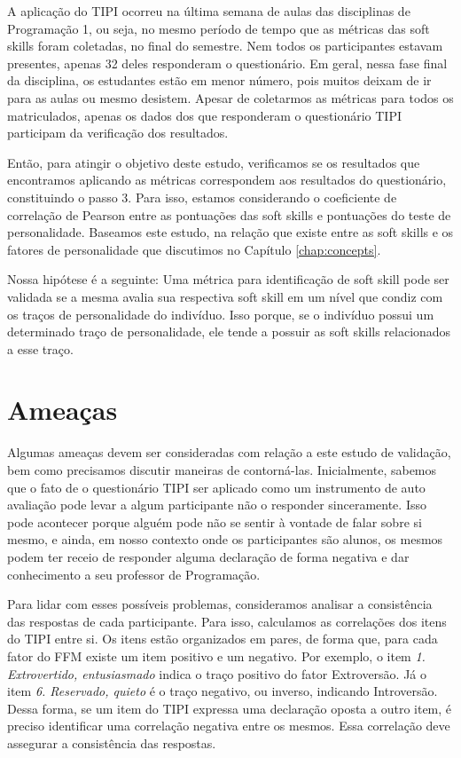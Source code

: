 A aplicação do TIPI ocorreu na última semana de aulas das disciplinas de Programação 1, ou seja, no mesmo período de tempo que as métricas das soft skills foram coletadas, no final do semestre. Nem todos os participantes estavam presentes, apenas 32 deles responderam o questionário. Em geral, nessa fase final da disciplina, os estudantes estão em menor número, pois muitos deixam de ir para as aulas ou mesmo desistem. Apesar de coletarmos as métricas para todos os matriculados, apenas os dados dos que responderam o questionário TIPI participam da verificação dos resultados.

Então, para atingir o objetivo deste estudo, verificamos se os resultados que encontramos aplicando as métricas correspondem aos resultados do questionário, constituindo o passo 3.
Para isso, estamos considerando o coeficiente de correlação de Pearson entre as pontuações das soft skills e pontuações do teste de personalidade.
Baseamos este estudo, na relação que existe entre as soft skills e os fatores de personalidade que discutimos no Capítulo \ref{chap:concepts}.

Nossa hipótese é a seguinte: Uma métrica para identificação de soft skill pode ser validada se a mesma avalia sua respectiva soft skill em um nível que condiz com os traços de personalidade do indivíduo. Isso porque, se o indivíduo possui um determinado traço de personalidade, ele tende a possuir as soft skills relacionados a esse traço.

\section{Ameaças}
\label{sec:ameacas}

Algumas ameaças devem ser consideradas com relação a este estudo de validação, bem como precisamos discutir maneiras de contorná-las.
Inicialmente, sabemos que o fato de o questionário TIPI ser aplicado como um instrumento de auto avaliação pode levar a algum participante não o responder sinceramente. Isso pode acontecer porque alguém pode não se sentir à vontade de falar sobre si mesmo, e ainda, em nosso contexto onde os participantes são alunos, os mesmos podem ter receio de responder alguma declaração de forma negativa e dar conhecimento a seu professor de Programação.

Para lidar com esses possíveis problemas, consideramos analisar a consistência das respostas de cada participante. Para isso, calculamos as correlações dos itens do TIPI entre si. Os itens estão organizados em pares, de forma que, para cada fator do FFM existe um item positivo e um negativo. Por exemplo, o item \textit{1. Extrovertido, entusiasmado} indica o traço positivo do fator Extroversão. Já o item \textit{6. Reservado, quieto} é o traço negativo, ou inverso, indicando Introversão. Dessa forma, se um item do TIPI expressa uma declaração oposta a outro item, é preciso identificar uma correlação negativa entre os mesmos. Essa correlação deve assegurar a consistência das respostas.

